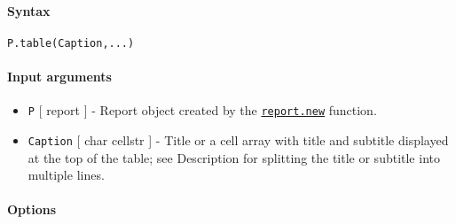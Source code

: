 


	\paragraph{Syntax}\label{syntax}

\begin{verbatim}
P.table(Caption,...)
\end{verbatim}

\paragraph{Input arguments}\label{input-arguments}

\begin{itemize}
\item
  \texttt{P} {[} report {]} - Report object created by the
  \href{report/new}{\texttt{report.new}} function.
\item
  \texttt{Caption} {[} char \textbar{} cellstr {]} - Title or a cell
  array with title and subtitle displayed at the top of the table; see
  Description for splitting the title or subtitle into multiple lines.
\end{itemize}

\paragraph{Options}\label{options}


